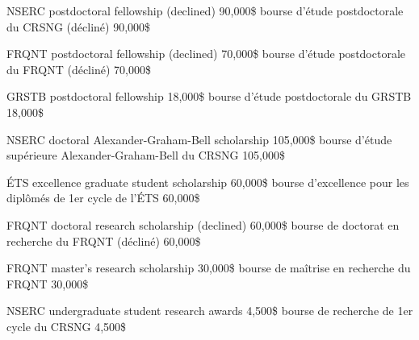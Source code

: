 \documentclass[print]{friggeri-cv}
\begin{document}
\begin{entrylist}

  \engfr
  { {{\small NSERC} postdoctoral fellowship (declined)} {90,000\$} {\vspace{-3mm}}}
  { {bourse d’étude postdoctorale du {\small CRSNG} (décliné)} {90,000\$} {\vspace{-3mm}}}

  \engfr
  { {{\small FRQNT} postdoctoral fellowship (declined)} {70,000\$} {\vspace{-3mm}}}
  { {bourse d’étude postdoctorale du {\small FRQNT} (décliné)} {70,000\$} {\vspace{-3mm}}}

  \engfr
  { {{\small GRSTB} postdoctoral fellowship} {18,000\$} {\vspace{-3mm}}}
  { {bourse d’étude postdoctorale du {\small GRSTB}} {18,000\$} {\vspace{-3mm}}}

  \engfr
  { {{\small NSERC} doctoral Alexander-Graham-Bell scholarship} {105,000\$} {\vspace{-3mm}}}
  { {bourse d’étude supérieure Alexander-Graham-Bell du {\small CRSNG}} {105,000\$} {\vspace{-3mm}}}

  \engfr
  { {{\small ÉTS} excellence graduate student scholarship} {60,000\$} {\vspace{-3mm}}}
  { {bourse d'excellence pour les diplômés de 1er cycle de l'ÉTS} {60,000\$} {\vspace{-3mm}}}

  \engfr
  { {{\small FRQNT} doctoral research scholarship (declined)} {60,000\$} {\vspace{-3mm}}}
  { {bourse de doctorat en recherche du {\small FRQNT} (décliné)} {60,000\$} {\vspace{-3mm}}}

  \engfr
  { {{\small FRQNT} master's research scholarship} {30,000\$} {\vspace{-3mm}}}
  { {bourse de maîtrise en recherche du {\small FRQNT}} {30,000\$} {\vspace{-3mm}}}

  \engfr
  { {{\small NSERC} undergraduate student research awards} {4,500\$} {\vspace{-3mm}}}
  { {bourse de recherche de 1er cycle du {\small CRSNG}} {4,500\$} {\vspace{-3mm}}}
\end{entrylist}
\end{document}
